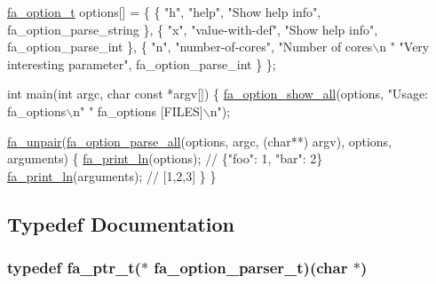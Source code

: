 \begin{DoxyCode}
\hyperlink{structfa__option__t}{fa\_option\_t} options[] = \{
    \{ \textcolor{stringliteral}{"h"}, \textcolor{stringliteral}{"help"},            \textcolor{stringliteral}{"Show help info"},             fa\_option\_parse\_string \},
    \{ \textcolor{stringliteral}{"x"}, \textcolor{stringliteral}{"value-with-def"},  \textcolor{stringliteral}{"Show help info"},             fa\_option\_parse\_int    \},
    \{ \textcolor{stringliteral}{"n"}, \textcolor{stringliteral}{"number-of-cores"}, \textcolor{stringliteral}{"Number of cores\(\backslash\)n                                   "}
                              \textcolor{stringliteral}{"Very interesting parameter"}, fa\_option\_parse\_int    \}
\};

\textcolor{keywordtype}{int} main(\textcolor{keywordtype}{int} argc, \textcolor{keywordtype}{char} \textcolor{keyword}{const} *argv[])
\{
    \hyperlink{group___fa_option_ga35db7ce1235a1061817436bedb1b39d6}{fa\_option\_show\_all}(options, \textcolor{stringliteral}{"Usage: fa\_options\(\backslash\)n"}
                                \textcolor{stringliteral}{"       fa\_options [FILES]\(\backslash\)n"});

    \hyperlink{macros_8h_a94e5194043847baedf04542aeff38060}{fa\_unpair}(\hyperlink{group___fa_option_gaf74fe1a41763c353bf8fa0ed7f4259c6}{fa\_option\_parse\_all}(options, argc, (\textcolor{keywordtype}{char}**) argv), options, 
      arguments) 
    \{
        \hyperlink{group___fa_gaf738240829f5d2d2352822c6974b7fc0}{fa\_print\_ln}(options);   \textcolor{comment}{// \{"foo": 1, "bar": 2\}}
        \hyperlink{group___fa_gaf738240829f5d2d2352822c6974b7fc0}{fa\_print\_ln}(arguments); \textcolor{comment}{// [1,2,3]}
    \}
\}
\end{DoxyCode}
 

\subsection{Typedef Documentation}
\hypertarget{group___fa_option_ga86aa8e13dfaaa7e6870855b204cfe3a0}{
\subsubsection[{fa\-\_\-option\-\_\-parser\-\_\-t}]{\setlength{\rightskip}{0pt plus 5cm}typedef {\bf fa\-\_\-ptr\-\_\-t}($\ast$  fa\-\_\-option\-\_\-parser\-\_\-t)(char $\ast$)}}\label{group___fa_option_ga86aa8e13dfaaa7e6870855b204cfe3a0}


